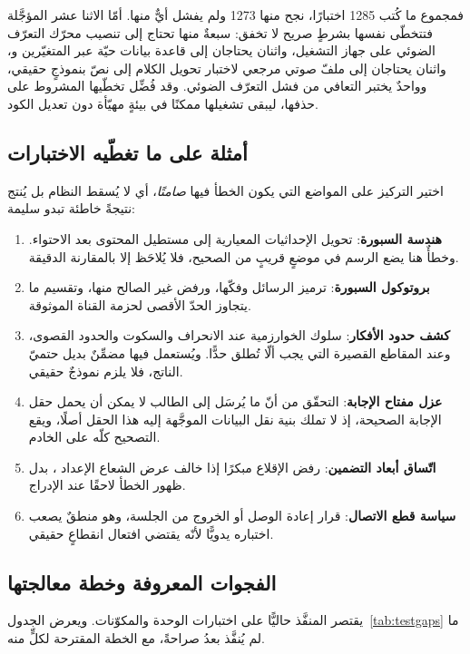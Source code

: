 فمجموع ما كُتب 1285 اختبارًا، نجح منها 1273 ولم يفشل أيٌّ منها. أمّا الاثنا عشر المؤجَّلة فتتخطّى نفسها بشرطٍ صريح لا تخفق: سبعةٌ منها تحتاج إلى تنصيب محرّك التعرّف الضوئي على جهاز التشغيل، واثنان يحتاجان إلى قاعدة بيانات حيّة عبر المتغيّرين  و، واثنان يحتاجان إلى ملفّ صوتي مرجعي لاختبار تحويل الكلام إلى نصّ بنموذجٍ حقيقي، وواحدٌ يختبر التعافي من فشل التعرّف الضوئي. وقد فُضِّل تخطّيها المشروط على حذفها، ليبقى تشغيلها ممكنًا في بيئةٍ مهيّأة دون تعديل الكود.

\subsection{أمثلة على ما تغطّيه الاختبارات}

اختير التركيز على المواضع التي يكون الخطأ فيها \emph{صامتًا}، أي لا يُسقط النظام بل يُنتج نتيجةً خاطئة تبدو سليمة:

\begin{enumerate}
  \item \textbf{هندسة السبورة}: تحويل الإحداثيات المعيارية إلى مستطيل المحتوى بعد الاحتواء. وخطأٌ هنا يضع الرسم في موضعٍ قريبٍ من الصحيح، فلا يُلاحَظ إلا بالمقارنة الدقيقة.
  \item \textbf{بروتوكول السبورة}: ترميز الرسائل وفكّها، ورفض غير الصالح منها، وتقسيم ما يتجاوز الحدّ الأقصى لحزمة القناة الموثوقة.
  \item \textbf{كشف حدود الأفكار}: سلوك الخوارزمية عند الانحراف والسكوت والحدود القصوى، وعند المقاطع القصيرة التي يجب ألّا تُطلق حدًّا. ويُستعمل فيها مضمِّنٌ بديل حتميّ الناتج، فلا يلزم نموذجٌ حقيقي.
  \item \textbf{عزل مفتاح الإجابة}: التحقّق من أنّ ما يُرسَل إلى الطالب لا يمكن أن يحمل حقل الإجابة الصحيحة، إذ لا تملك بنية نقل البيانات الموجَّهة إليه هذا الحقل أصلًا، ويقع التصحيح كلّه على الخادم.
  \item \textbf{اتّساق أبعاد التضمين}: رفض الإقلاع مبكرًا إذا خالف عرض الشعاع الإعداد ، بدل ظهور الخطأ لاحقًا عند الإدراج.
  \item \textbf{سياسة قطع الاتصال}: قرار إعادة الوصل أو الخروج من الجلسة، وهو منطقٌ يصعب اختباره يدويًّا لأنّه يقتضي افتعال انقطاعٍ حقيقي.
\end{enumerate}

\subsection{الفجوات المعروفة وخطة معالجتها}

يقتصر المنفَّذ حاليًّا على اختبارات الوحدة والمكوّنات. ويعرض الجدول~\ref{tab:testgaps} ما لم يُنفَّذ بعدُ صراحةً، مع الخطة المقترحة لكلٍّ منه.

